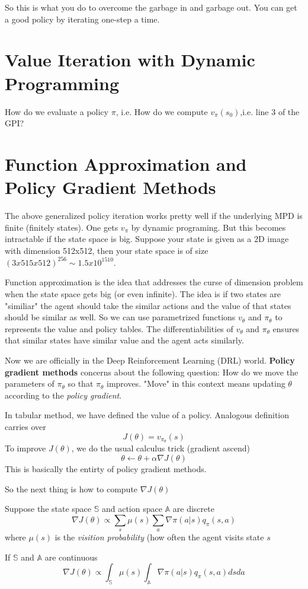 \documentclass{article}
\begin{document}
So this is what you do to overcome the garbage in and garbage out. 
You can get a good policy by iterating one-step a time.

\section{Value Iteration with Dynamic Programming}
How do we evaluate a policy $\pi$, i.e. 
How do we compute $v_{\pi}(s_0)$,i.e. line 3 of the GPI? 


\section{Function Approximation and Policy Gradient Methods}
The above generalized policy iteration works pretty well if the underlying
MPD is finite (finitely states). One gets $v_{\pi}$ by dynamic programing.
But this becomes intractable if the state space is big. Suppose your 
state is given as a 2D image with dimension 512x512, then your state
space is of size $(3x515x512)^{256} \sim 1.5x10^{1510}$. 

Function approximation is the idea that addresses the curse of dimension
problem when the state space gets big (or even infinite). The idea is 
if two states are "similiar" the agent should take the similar actions 
and the value of that states should be similar as well. So we can use
parametrized functions $v_{\theta}$ and $\pi_{\theta}$ to represents 
the value and policy tables. The differentiabilities of $v_{\theta}$ 
and $\pi_{\theta}$ ensures that similar states have similar value and 
the agent acts similarly. 

Now we are officially in the Deep Reinforcement Learning (DRL) world. 
\textbf{Policy gradient methods} concerns about the following question:
How do we move the parameters of $\pi_{\theta}$ so that $\pi_{\theta}$
improves. "Move" in this context means updating $\theta$ according to 
the \emph{policy gradient}. 

In tabular method, we have defined the value of a policy. Analogous 
definition carries over
\[
    J(\theta) = v_{\pi_{\theta}}(s)
\]
To improve $J(\theta)$, we do the usual calculus trick (gradient ascend)
\[
    \theta \leftarrow \theta + \alpha \nabla J(\theta)
\]
This is basically the entirty of policy gradient methods.

So the next thing is how to compute $\nabla J(\theta)$ 


\begin{theorem}
Suppose the state space $\mathbb{S}$ and action space $\mathbb{A}$ 
are discrete
\[
    \nabla J(\theta) \propto \sum_{s}\mu(s)\sum_{a} 
    \nabla \pi(a|s)q_{\pi}(s, a)
\]
where $\mu(s)$ is the \emph{visition probability} (how often the 
agent visits state $s$

If $\mathbb{S}$ and $\mathbb{A}$ are continuous
\[
    \nabla J(\theta) \propto \int_{\mathbb{S}}\mu(s)\int_{\mathbb{A}} 
    \nabla\pi(a|s)q_{\pi}(s, a) dsda
\]
\end{theorem}
\end{document}
